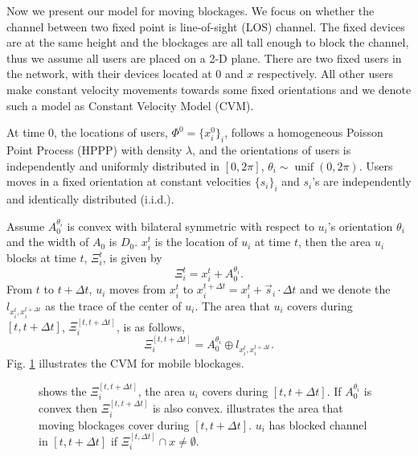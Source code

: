 \documentclass[10pt, conference, letterpaper]{IEEEtran}
\DeclareMathOperator*{\unif}{unif}
\begin{document}
Now we present our model for moving blockages. 
We focus on whether the channel between two fixed point is line-of-sight (LOS) channel. 
The fixed devices are at the same height and the blockages are all tall enough to block the channel, thus we assume all users are placed on a 2-D plane. 
There are two fixed users in the network, with their devices located at $0$ and $x$ respectively.
All other users make constant velocity movements towards some fixed orientations and we denote such a model as Constant Velocity Model (CVM).

At time $0$, the locations of users, $\Phi^0 = \{x_i^0\}_i$, follows a homogeneous Poisson Point Process (HPPP) with density $\lambda$, and the orientations of users is independently and uniformly distributed in $[0, 2\pi]$, $\theta_i \sim \unif(0, 2\pi)$. 
Users moves in a fixed orientation at constant velocities $\{s_i\}_i$ and $s_i$'s are independently and identically distributed (i.i.d.).

Assume $A_0^{\theta_i}$ is convex with bilateral symmetric with respect to $u_i$'s orientation $\theta_i$ and the width of $A_0$ is $D_0$. $x_i^t$ is the location of $u_i$ at time $t$, then the area $u_i$ blocks at time $t$, $\Xi_{i}^t$, is given by 
\begin{equation*}
\Xi_{i}^t = x_i^t + A_0^{\theta_i}.
\end{equation*}
From $t$ to $t+\Delta t$, $u_i$ moves from $x_i^t$ to $x_i^{t+\Delta t} = x_i^t + \vec{s}_i\cdot \Delta t$ and we denote the $l_{x_i^t, x_i ^{t+\Delta t}}$ as the trace of the center of $u_i$. The area that $u_i$ covers during $[t, t+\Delta t]$, $\Xi_i^{[t, t+\Delta t]}$, is as follows, 
\begin{equation*} %
\Xi_i^{[t, t+\Delta t]} = A_0^{\theta_i} \oplus l_{x_i^t, x_i ^{t+\Delta t} }.
\end{equation*}
Fig. \ref{fig:boolean} illustrates the CVM for mobile blockages.

\begin{figure}
	\centering
	\mbox{}
	\mbox{}
	\caption[]{ shows the $\Xi_i^{[t, t+\Delta t]}$, the area $u_i$ covers during $[t, t+\Delta t]$. If $A_0^{\theta_i}$ is convex then $\Xi_i^{[t, t+\Delta t]}$ is also convex.  illustrates the area that moving blockages cover during $[t, t+\Delta t]$. $u_i$ has blocked channel in $[t, t+ \Delta t]$ if $\Xi_i^{[t, \Delta t]}\cap x \neq \emptyset$. }
	\label{fig:boolean}
\end{figure}
\end{document}
